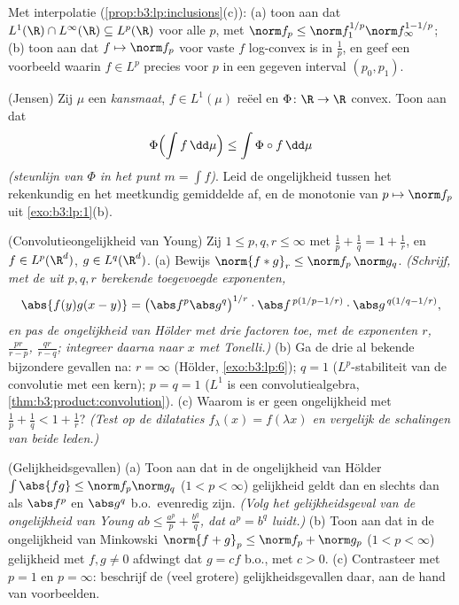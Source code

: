 \begin{exercise}[$\star\star$]\label{exo:b3:lp:9}
Met interpolatie (\cref{prop:b3:lp:inclusions}(c)):
(a) toon aan dat $L^1(\R)\cap L^\infty(\R) \subseteq L^p(\R)$
voor alle $p$, met $\norm f_p \leq \norm f_1^{1/p}\norm
f_\infty^{1 - 1/p}$;
(b) toon aan dat $f \mapsto \norm f_p$ voor vaste $f$
log-convex is in $\frac1p$, en geef een voorbeeld waarin $f \in
L^p$ precies voor $p$ in een gegeven interval $(p_0, p_1)$.
\end{exercise}

\begin{exercise}[$\star\star$]\label{exo:b3:lp:10}
(Jensen) Zij $\mu$ een \emph{kansmaat}, $f \in L^1(\mu)$ reëel en
$\Phi \colon \R \to \R$ convex. Toon aan dat
\[
\Phi\Bigl(\int f\,\dd\mu\Bigr) \leq \int \Phi\circ
f\,\dd\mu
\]
\emph{(steunlijn van $\Phi$ in het punt $m = \int f$)}. Leid de
ongelijkheid tussen het rekenkundig en het meetkundig gemiddelde
af, en de monotonie van $p \mapsto \norm f_p$ uit
\cref{exo:b3:lp:1}(b).
\end{exercise}

\begin{exercise}[$\star\star\star$]\label{exo:b3:lp:11}
(Convolutieongelijkheid van Young) Zij $1 \leq p, q, r \leq
\infty$ met $\frac1p + \frac1q = 1 + \frac1r$, en $f \in
L^p(\R^d)$, $g \in L^q(\R^d)$.
(a) Bewijs $\norm{f * g}_r \leq \norm f_p\,\norm g_q$.
\emph{(Schrijf, met de uit $p, q, r$ berekende toegevoegde
exponenten,
\[
\abs{f(y)g(x-y)} = \bigl(\abs f^p\abs g^q\bigr)^{1/r}
\cdot\abs f^{\,p(1/p - 1/r)}\cdot\abs g^{\,q(1/q - 1/r)},
\]
en pas de ongelijkheid van Hölder met drie factoren toe, met de
exponenten $r$, $\frac{pr}{r - p}$, $\frac{qr}{r - q}$;
integreer daarna naar $x$ met Tonelli.)}
(b) Ga de drie al bekende bijzondere gevallen na: $r = \infty$
(Hölder, \cref{exo:b3:lp:6}); $q = 1$ ($L^p$-stabiliteit van de
convolutie met een  kern); $p = q = 1$ ($L^1$ is
een convolutiealgebra, \cref{thm:b3:product:convolution}).
(c) Waarom is er geen ongelijkheid met $\frac1p + \frac1q < 1 +
\frac1r$? \emph{(Test op de dilataties $f_\lambda(x) =
f(\lambda x)$ en vergelijk de schalingen van beide leden.)}
\end{exercise}

\begin{exercise}[$\star\star$]\label{exo:b3:lp:12}
(Gelijkheidsgevallen) (a) Toon aan dat in de ongelijkheid van
Hölder $\int\abs{fg} \leq \norm f_p\norm g_q$ ($1 < p < \infty$)
gelijkheid geldt dan en slechts dan als $\abs f^p$ en $\abs g^q$
b.o.\ evenredig zijn. \emph{(Volg het gelijkheidsgeval van de
ongelijkheid van Young $ab \leq \frac{a^p}p + \frac{b^q}q$, dat
$a^p = b^q$ luidt.)}
(b) Toon aan dat in de ongelijkheid van Minkowski $\norm{f + g}_p
\leq \norm f_p + \norm g_p$ ($1 < p < \infty$) gelijkheid met $f,
g \neq 0$ afdwingt dat $g = cf$ b.o., met $c > 0$.
(c) Contrasteer met $p = 1$ en $p = \infty$: beschrijf de (veel
grotere) gelijkheidsgevallen daar, aan de hand van voorbeelden.
\end{exercise}


